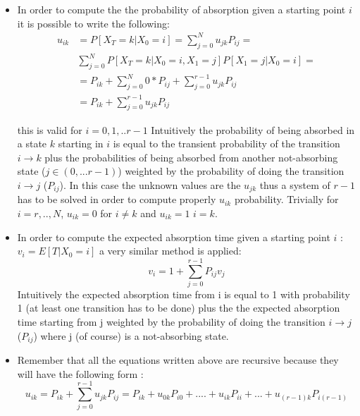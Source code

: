 \begin{itemize}
\begin{itemize}
     \end{itemize}
    \item In order to compute the the probability of absorption given a starting point $i$ it is possible to write the following:
    \begin{equation}
    \begin{split}
      u_{ik} &= P[X_T=k|X_0=i]= \sum\limits_{j=0}^N u_{jk}P_{ij}=\\
      &\sum\limits_{j=0}^N P[X_T=k|X_0=i,X_1=j]P[X_1=j|X_0=i]=\\
      &= P_{ik}+\sum\limits_{j=0}^N 0*P_{ij} +\sum\limits_{j=0}^{r-1} u_{jk}P_{ij}\\
      &=P_{ik}+\sum\limits_{j=0}^{r-1} u_{jk}P_{ij}
      \end{split}
     \end{equation}

       this is valid for $i= 0,1,..r-1$
    Intuitively the probability of being absorbed in a state $k$ starting in $i$ is equal to the transient probability of the transition $i\rightarrow k$ plus the probabilities of being absorbed from another not-absorbing state ($j \in (0,...r-1)$) weighted by the probability of doing the transition  $i\rightarrow j$ ($P_{ij}$).
    In this case the unknown values are the $u_{jk}$ thus
    a system of $ r-1$ has to be solved in order to compute properly $u_{ik}$ probability.
     \newline Trivially for $i= r,.. , N$, $u_{ik}=0$ for $i\neq k$ and $u_{ik}=1$ $i=k$.

 \item In order to compute the expected absorption time given a starting point $i$ : $v_i= E[T|X_0=i]$ a very similar method is applied:
 \begin{equation}
 v_i= 1 + \sum\limits_{j=0}^{r-1} P_{ij} v_j
  \end{equation}
   Intuitively the expected absorption time from i is equal to 1 with probability 1 (at least one transition has to be done) plus the  the expected absorption time starting from j weighted by the probability of doing the transition  $i\rightarrow j$ ($P_{ij}$) where j (of course) is a not-absorbing state.

  \item Remember that all the equations written above are recursive because they will have the following form :
  \begin{equation}
     u_{ik}= P_{ik}+\sum\limits_{j=0}^{r-1} u_{jk}P_{ij} =  P_{ik}+ u_{0k}P_{i0} + .... + u_{ik}P_{ii} + ... +  u_{(r-1)k}P_{i(r-1)}
   \end{equation}
\end{itemize}

